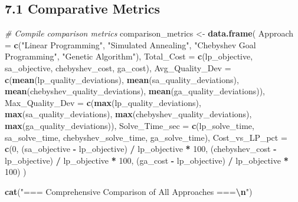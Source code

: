 \documentclass[
]{article}
\newenvironment{Shaded}{\begin{snugshade}}{\end{snugshade}}
\newcommand{\AttributeTok}[1]{\textcolor[rgb]{0.13,0.29,0.53}{#1}}
\newcommand{\CommentTok}[1]{\textcolor[rgb]{0.56,0.35,0.01}{\textit{#1}}}
\newcommand{\DecValTok}[1]{\textcolor[rgb]{0.00,0.00,0.81}{#1}}
\newcommand{\FunctionTok}[1]{\textcolor[rgb]{0.13,0.29,0.53}{\textbf{#1}}}
\newcommand{\NormalTok}[1]{#1}
\newcommand{\OtherTok}[1]{\textcolor[rgb]{0.56,0.35,0.01}{#1}}
\newcommand{\SpecialCharTok}[1]{\textcolor[rgb]{0.81,0.36,0.00}{\textbf{#1}}}
\newcommand{\StringTok}[1]{\textcolor[rgb]{0.31,0.60,0.02}{#1}}
\begin{document}
\subsection{7.1 Comparative Metrics}\label{comparative-metrics}

\begin{Shaded}
\begin{Highlighting}[]
\CommentTok{\# Compile comparison metrics}
\NormalTok{comparison\_metrics }\OtherTok{\textless{}{-}} \FunctionTok{data.frame}\NormalTok{(}
  \AttributeTok{Approach =} \FunctionTok{c}\NormalTok{(}\StringTok{"Linear Programming"}\NormalTok{, }\StringTok{"Simulated Annealing"}\NormalTok{, }
               \StringTok{"Chebyshev Goal Programming"}\NormalTok{, }\StringTok{"Genetic Algorithm"}\NormalTok{),}
  \AttributeTok{Total\_Cost =} \FunctionTok{c}\NormalTok{(lp\_objective, sa\_objective, chebyshev\_cost, ga\_cost),}
  \AttributeTok{Avg\_Quality\_Dev =} \FunctionTok{c}\NormalTok{(}\FunctionTok{mean}\NormalTok{(lp\_quality\_deviations), }
                      \FunctionTok{mean}\NormalTok{(sa\_quality\_deviations),}
                      \FunctionTok{mean}\NormalTok{(chebyshev\_quality\_deviations),}
                      \FunctionTok{mean}\NormalTok{(ga\_quality\_deviations)),}
  \AttributeTok{Max\_Quality\_Dev =} \FunctionTok{c}\NormalTok{(}\FunctionTok{max}\NormalTok{(lp\_quality\_deviations),}
                     \FunctionTok{max}\NormalTok{(sa\_quality\_deviations),}
                     \FunctionTok{max}\NormalTok{(chebyshev\_quality\_deviations),}
                     \FunctionTok{max}\NormalTok{(ga\_quality\_deviations)),}
  \AttributeTok{Solve\_Time\_sec =} \FunctionTok{c}\NormalTok{(lp\_solve\_time, sa\_solve\_time, }
\NormalTok{                     chebyshev\_solve\_time, ga\_solve\_time),}
  \AttributeTok{Cost\_vs\_LP\_pct =} \FunctionTok{c}\NormalTok{(}\DecValTok{0}\NormalTok{, }
\NormalTok{                    (sa\_objective }\SpecialCharTok{{-}}\NormalTok{ lp\_objective) }\SpecialCharTok{/}\NormalTok{ lp\_objective }\SpecialCharTok{*} \DecValTok{100}\NormalTok{,}
\NormalTok{                    (chebyshev\_cost }\SpecialCharTok{{-}}\NormalTok{ lp\_objective) }\SpecialCharTok{/}\NormalTok{ lp\_objective }\SpecialCharTok{*} \DecValTok{100}\NormalTok{,}
\NormalTok{                    (ga\_cost }\SpecialCharTok{{-}}\NormalTok{ lp\_objective) }\SpecialCharTok{/}\NormalTok{ lp\_objective }\SpecialCharTok{*} \DecValTok{100}\NormalTok{)}
\NormalTok{)}

\FunctionTok{cat}\NormalTok{(}\StringTok{"=== Comprehensive Comparison of All Approaches ===}\SpecialCharTok{\textbackslash{}n}\StringTok{"}\NormalTok{)}
\end{Highlighting}
\end{Shaded}
\end{document}
